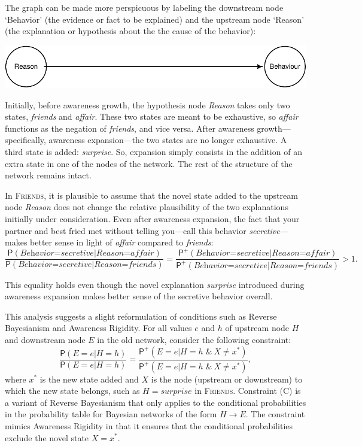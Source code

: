 \documentclass[
  11pt,
  dvipsnames,enabledeprecatedfontcommands]{scrartcl}
\newcommand{\pr}[1]{\ensuremath{\mathsf{P}(#1)}}
\newcommand{\ppr}[2]{\ensuremath{\mathsf{P}^{#1}(#2)}}
\begin{document}
The graph can be made more perspicuous by labeling the downstream node
`Behavior' (the evidence or fact to be explained) and the upstream node
`Reason' (the explanation or hypothesis about the the cause of the
behavior):

\begin{center}\includegraphics[width=0.5\linewidth,height=0.5\textheight]{ReplyToSteeleStefansson5_files/figure-latex/friendsDAG-1} \end{center}

Initially, before awareness growth, the hypothesis node \textit{Reason}
takes only two states, \textit{friends} and \textit{affair}. These two
states are meant to be exhaustive, so \textit{affair} functions as the
negation of \textit{friends}, and vice versa. After awareness
growth---specifically, awareness expansion---the two states are no
longer exhaustive. A third state is added: \textit{surprise}. So,
expansion simply consists in the addition of an extra state in one of
the nodes of the network. The rest of the structure of the network
remains intact.

In \textsc{Friends}, it is plausible to assume that the novel state
added to the upstream node \textit{Reason} does not change the relative
plausibility of the two explanations initially under consideration. Even
after awareness expansion, the fact that your partner and best fried met
without telling you---call this behavior \textit{secretive}---makes
better sense in light of \textit{affair} compared to \textit{friends}:
\[\frac{\pr{\textit{Behavior=secretive} \vert \textit{Reason=affair}}}{\pr{\textit{Behavior=secretive} \vert  \textit{Reason=friends}}} = \frac{\ppr{+}{\textit{Behavior=secretive} \vert \textit{Reason=affair}}}{\ppr{+}{\textit{Behavior=secretive} \vert \textit{Reason=friends}}}>1. \]

\noindent This equality holds even though the novel explanation
\textit{surprise} introduced during awareness expansion makes better
sense of the secretive behavior overall.

This analysis suggests a slight reformulation of conditions such as
Reverse Bayesianism and Awareness Rigidity. For all values \(e\) and
\(h\) of upstream node \(H\) and downstream node \(E\) in the old
network, consider the following constraint:
\[\frac{\pr{E=e \vert H=h}}{\pr{E=e \vert H=h}} = \frac{\ppr{+}{E=e \vert H=h  \; \& \: X\neq x^*}}{\ppr{+}{E=e \vert H=h  \; \& \: X\neq x^*}}, \tag{C}\]
where \(x^*\) is the new state added and \(X\) is the node (upstream or
downstream) to which the new state belongs, such as
\(H=\textit{surprise}\) in \textsc{Friends}. Constraint (C) is a variant
of Reverse Bayesianism that only applies to the conditional
probabilities in the probability table for Bayesian networks of the form
\(H \rightarrow E\). The constraint mimics Awareness Rigidity in that it
ensures that the conditional probabilities exclude the novel state
\(X=x^*\).
\end{document}
